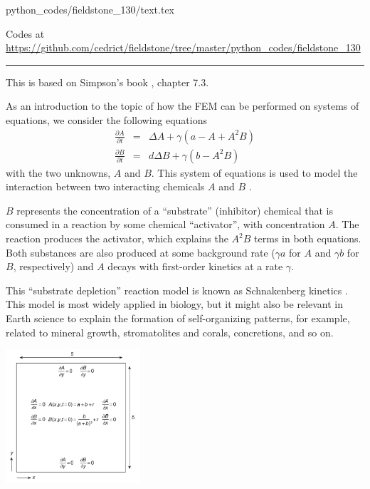 \begin{flushright} {\tiny {\color{gray} python\_codes/fieldstone\_130/text.tex}} \end{flushright}

%

\begin{center}
Codes at \url{https://github.com/cedrict/fieldstone/tree/master/python_codes/fieldstone_130}
\end{center}

\par\noindent\rule{\textwidth}{0.4pt}


This is based on Simpson's book \cite{simp17}, chapter 7.3.

As an introduction to the topic of how the FEM can be
performed on systems of equations, we consider the following equations
\begin{eqnarray}
\frac{\partial A}{\partial t} &=& \Delta A  + \gamma (a-A+A^2B) \\
\frac{\partial B}{\partial t} &=& d \Delta B  + \gamma (b-A^2B) 
\end{eqnarray}
with the two unknowns, $A$ and $B$. This system of equations is used to model the interaction between
two interacting chemicals $A$ and $B$ \cite{mawb12}.

$B$ represents the concentration of
a ``substrate'' (inhibitor) chemical that is consumed in a reaction by some chemical ``activator'',
with concentration $A$. The reaction produces the activator, which explains the $A^2B$ terms in both
equations. Both substances are also produced at some background rate ($\gamma a$ for $A$ and $\gamma b$ for $B$,
respectively) and $A$ decays with first-order kinetics at a rate $\gamma$.

This ``substrate depletion'' reaction
model is known as Schnakenberg kinetics \cite{gime72,schn79}. This
model is most widely applied in biology, but it might also be relevant in Earth science to explain
the formation of self-organizing patterns, for example, related to mineral growth, stromatolites and
corals, concretions, and so on.

\begin{center}
\includegraphics[width=5cm]{python_codes/fieldstone_130/images/simpson1}
\end{center}

